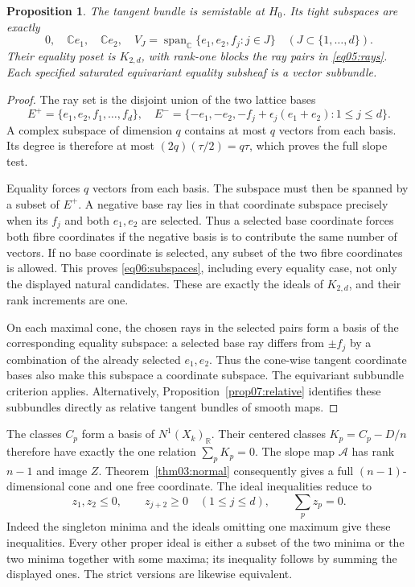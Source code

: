 \documentclass[11pt]{amsart}
\newtheorem{proposition}[theorem]{Proposition}
\theoremstyle{definition}
\theoremstyle{remark}
\newcommand{\RR}{\mathbb R}
\newcommand{\CC}{\mathbb C}
\newcommand{\spanC}{\operatorname{span}_{\CC}}
\begin{document}
\begin{proposition}\label{prop06:equality}
The tangent bundle is semistable at \(H_0\). Its tight subspaces are
exactly
\begin{equation}\label{eq06:subspaces}
 0,\quad \CC e_1,\quad \CC e_2,\quad
 V_J=\spanC\{e_1,e_2,f_j:j\in J\}
               \quad(J\subset\{1,\ldots,d\}).
\end{equation}
Their equality poset is \(K_{2,d}\), with rank-one blocks the ray
pairs in \eqref{eq05:rays}. Each specified saturated equivariant
equality subsheaf is a vector subbundle.
\end{proposition}

\begin{proof}
The ray set is the disjoint union of the two lattice bases
\[
 E^+=\{e_1,e_2,f_1,\ldots,f_d\},\quad
 E^-=\{-e_1,-e_2,-f_j+\epsilon_j(e_1+e_2):1\le j\le d\}.
\]
A complex subspace of dimension \(q\) contains at most \(q\)
vectors from each basis. Its degree is therefore at most
\((2q)(\tau/2)=q\tau\), which proves the full slope test.

Equality forces \(q\) vectors from each basis. The subspace must
then be spanned by a subset of \(E^+\). A negative base ray lies
in that coordinate subspace precisely when its \(f_j\) and both
\(e_1,e_2\) are selected. Thus a selected base coordinate forces
both fibre coordinates if the negative basis is to contribute the
same number of vectors. If no base coordinate is selected, any
subset of the two fibre coordinates is allowed. This proves
\eqref{eq06:subspaces}, including every equality case, not only
the displayed natural candidates. These are exactly the ideals of
\(K_{2,d}\), and their rank increments are one.

On each maximal cone, the chosen rays in the selected pairs form
a basis of the corresponding equality subspace: a selected base
ray differs from \(\pm f_j\) by a combination of the already
selected \(e_1,e_2\). Thus the cone-wise tangent coordinate bases
also make this subspace a coordinate subspace. The equivariant
subbundle criterion
\cite[Proposition~4.1.1]{khandasgupta2019} applies. Alternatively,
Proposition~\ref{prop07:relative} identifies these subbundles
directly as relative tangent bundles of smooth maps.
\end{proof}

The classes \(C_p\) form a basis of \(N^1(X_k)_\RR\). Their
centered classes \(K_p=C_p-D/n\) therefore have exactly the one
relation \(\sum_pK_p=0\). The slope map \(\mathcal A\) has rank
\(n-1\) and image \(Z\). Theorem~\ref{thm03:normal} consequently
gives a full \((n-1)\)-dimensional cone and one free coordinate.
The ideal inequalities reduce to
\begin{equation}\label{eq06:chamber}
 z_1,z_2\le0,\qquad z_{j+2}\ge0\quad(1\le j\le d),
 \qquad\sum_pz_p=0.
\end{equation}
Indeed the singleton minima and the ideals omitting one maximum give
these inequalities. Every other proper ideal is either a subset of
the two minima or the two minima together with some maxima; its
inequality follows by summing the displayed ones. The strict
versions are likewise equivalent.
\end{document}
